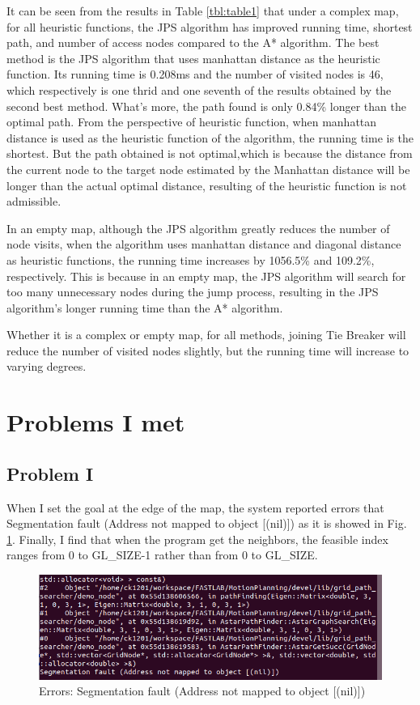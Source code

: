\documentclass[conference]{IEEEtran}
\begin{document}
It can be seen from the results in Table \ref {tbl:table1} that under a complex map, for all heuristic functions, the JPS algorithm has improved running time, shortest path, and number of access nodes compared to the A* algorithm. The best method is the JPS algorithm that uses manhattan distance as the heuristic function. Its running time is 0.208ms and the number of visited nodes is 46, which respectively is one thrid and one seventh of the results obtained by the second best method. What's more, the path found is only 0.84\% longer than the optimal path. From the perspective of heuristic function, when manhattan distance is used as the heuristic function of the algorithm, the running time is the shortest. But the path obtained is not optimal,which is because the distance from the current node to the target node estimated by the Manhattan distance will be longer than the actual optimal distance, resulting of the heuristic function is not admissible.

In an empty map, although the JPS algorithm greatly reduces the number of node visits, when the algorithm uses manhattan distance and diagonal distance as heuristic functions, the running time increases by 1056.5\% and 109.2\%, respectively. This is because in an empty map, the JPS algorithm will search for too many unnecessary nodes during the jump process, resulting in the JPS algorithm's longer running time than the A* algorithm.

Whether it is a complex or empty map, for all methods, joining Tie Breaker will reduce the number of visited nodes slightly, but the running time will increase to varying degrees.

\section{Problems I met}
\subsection{Problem I}
When I set the goal at the edge of the map, the system reported errors that Segmentation fault (Address not mapped to object [(nil)]) as it is showed in Fig. \ref{fig:label5_1}. Finally, I find that when the program get the neighbors, the feasible index ranges from 0 to GL\_SIZE-1 rather than from 0 to GL\_SIZE.

\begin{figure}[htbp]
	\centering
	\includegraphics[scale=0.3]{figs/fig5_1.png}
	\caption{Errors: Segmentation fault (Address not mapped to object [(nil)])}
	\label{fig:label5_1}
\end{figure}
\end{document}
